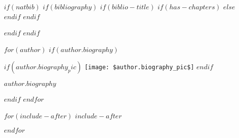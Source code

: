 \documentclass[webpdf$if(papersize)$,$papersize$$else$,large$endif$$if(document_style)$,$document_style$$else$,contemporary$endif$$if(numbersections)$$else$,unnumsec$endif$$if(namedate)$,namedate$endif$$if(classoptions)$,$for(classoptions)$$classoptions$$sep$,$endfor$$endif$]{oup-authoring-template}
\begin{document}
$if(natbib)$
$if(bibliography)$
$if(biblio-title)$
$if(has-chapters)$
\renewcommand\bibname{$biblio-title$}
$else$
\renewcommand\refname{$biblio-title$}
$endif$
$endif$



$endif$
$endif$

$for(author)$
$if(author.biography)$
\begin{biography}{%
$if(author.biography_pic)$
\texttt{[image: \$author.biography\_pic\$]}%
$endif$%
}{\author{$author.name$} $author.biography$}
\end{biography}
$endif$
$endfor$

$for(include-after)$
$include-after$

$endfor$
\end{document}
